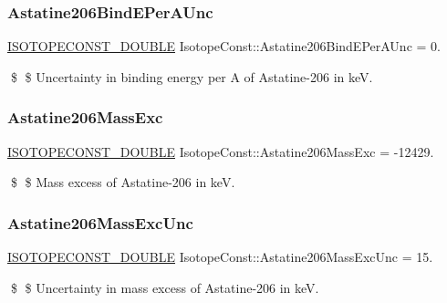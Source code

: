 \subsubsection{\texorpdfstring{Astatine206\+Bind\+E\+Per\+A\+Unc}{Astatine206BindEPerAUnc}}
{\footnotesize\ttfamily \mbox{\hyperlink{group___isotope_const-_macros_ga8f45a7272ce02c0b4c65c44636ed719a}{I\+S\+O\+T\+O\+P\+E\+C\+O\+N\+S\+T\+\_\+\+D\+O\+U\+B\+LE}} Isotope\+Const\+::\+Astatine206\+Bind\+E\+Per\+A\+Unc = 0.}

\$ \$ Uncertainty in binding energy per A of Astatine-\/206 in keV. \mbox{\label{group___isotope_const-_astatine-_at206_gadaa79e23c6c8ed2fcc063c6e25be313b}} 
\subsubsection{\texorpdfstring{Astatine206\+Mass\+Exc}{Astatine206MassExc}}
{\footnotesize\ttfamily \mbox{\hyperlink{group___isotope_const-_macros_ga8f45a7272ce02c0b4c65c44636ed719a}{I\+S\+O\+T\+O\+P\+E\+C\+O\+N\+S\+T\+\_\+\+D\+O\+U\+B\+LE}} Isotope\+Const\+::\+Astatine206\+Mass\+Exc = -\/12429.}

\$ \$ Mass excess of Astatine-\/206 in keV. \mbox{\label{group___isotope_const-_astatine-_at206_ga69be20969f0373a9a3fd0cff22a23ab7}} 
\subsubsection{\texorpdfstring{Astatine206\+Mass\+Exc\+Unc}{Astatine206MassExcUnc}}
{\footnotesize\ttfamily \mbox{\hyperlink{group___isotope_const-_macros_ga8f45a7272ce02c0b4c65c44636ed719a}{I\+S\+O\+T\+O\+P\+E\+C\+O\+N\+S\+T\+\_\+\+D\+O\+U\+B\+LE}} Isotope\+Const\+::\+Astatine206\+Mass\+Exc\+Unc = 15.}

\$ \$ Uncertainty in mass excess of Astatine-\/206 in keV. \mbox{\label{group___isotope_const-_astatine-_at206_ga20c0c10bce02475d88647648c79cf89d}} 
